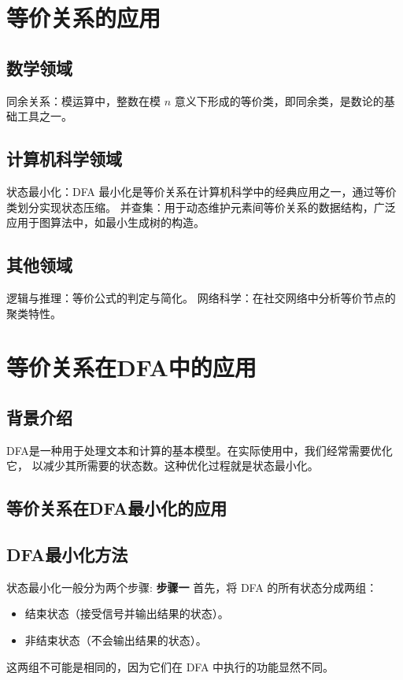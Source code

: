 \documentclass{article}
\begin{document}
\section{等价关系的应用}
\subsection{数学领域}
同余关系：模运算中，整数在模 
$n$ 意义下形成的等价类，即同余类，是数论的基础工具之一。
\subsection{计算机科学领域}
状态最小化：DFA 最小化是等价关系在计算机科学中的经典应用之一，通过等价类划分实现状态压缩。
并查集：用于动态维护元素间等价关系的数据结构，广泛应用于图算法中，如最小生成树的构造。

\subsection{其他领域}
逻辑与推理：等价公式的判定与简化。
网络科学：在社交网络中分析等价节点的聚类特性。


\section{等价关系在DFA中的应用}
\subsection{背景介绍}
    DFA是一种用于处理文本和计算的基本模型。在实际使用中，我们经常需要优化它，
    以减少其所需要的状态数。这种优化过程就是状态最小化。
\subsection{等价关系在DFA最小化的应用}

\subsection{DFA最小化方法}
    状态最小化一般分为两个步骤:
    \textbf{步骤一}
    首先，将 DFA 的所有状态分成两组：
    \begin{itemize}
        \item 结束状态（接受信号并输出结果的状态）。
        \item 非结束状态（不会输出结果的状态）。 
    \end{itemize}
    这两组不可能是相同的，因为它们在 DFA 中执行的功能显然不同。   
\end{document}

